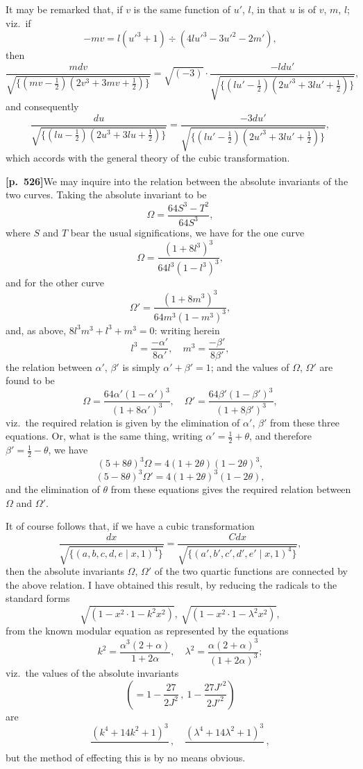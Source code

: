 \documentclass[11pt,a4paper]{article}
\begin{document}
It may be remarked that, if $v$ is the same function of $u'$, $l$, in that $u$ is of $v$, $m$, $l$; viz.\ if
\[
-mv = l(u'^{3} + 1) \div (4lu'^{3} - 3u'^{2} - 2m'),
\]
then
\[
\frac{mdv}{\sqrt{\{(mv - \tfrac{1}{2})(2v^{3} + 3mv + \tfrac{1}{2})\}}} = \sqrt{(-3)} \cdot \frac{-ldu'}{\sqrt{\{(lu' - \tfrac{1}{2})(2u'^{3} + 3lu' + \tfrac{1}{2})\}}},
\]
and consequently
\[
\frac{du}{\sqrt{\{(lu - \tfrac{1}{2})(2u^{3} + 3lu + \tfrac{1}{2})\}}} = \frac{-3du'}{\sqrt{\{(lu' - \tfrac{1}{2})(2u'^{3} + 3lu' + \tfrac{1}{2})\}}},
\]
which accords with the general theory of the cubic transformation.

\noindent\textbf{[p.~526]}\quad We may inquire into the relation between the absolute invariants of the two curves. Taking the absolute invariant to be
\[
\Omega = \frac{64S^{3} - T^{2}}{64S^{3}},
\]
where $S$ and $T$ bear the usual significations, we have for the one curve
\[
\Omega = \frac{(1 + 8l^{3})^{3}}{64l^{3}(1 - l^{3})^{3}},
\]
and for the other curve
\[
\Omega' = \frac{(1 + 8m^{3})^{3}}{64m^{3}(1 - m^{3})^{3}},
\]
and, as above, $8l^{3}m^{3} + l^{3} + m^{3} = 0$: writing herein
\[
l^{3} = \frac{-\alpha'}{8\alpha'},\quad m^{3} = \frac{-\beta'}{8\beta'},
\]
the relation between $\alpha'$, $\beta'$ is simply $\alpha' + \beta' = 1$; and the values of $\Omega$, $\Omega'$ are found to be
\[
\Omega = \frac{64\alpha'(1 - \alpha')^{3}}{(1 + 8\alpha')^{3}},\quad \Omega' = \frac{64\beta'(1 - \beta')^{3}}{(1 + 8\beta')^{3}},
\]
viz.\ the required relation is given by the elimination of $\alpha'$, $\beta'$ from these three equations. Or, what is the same thing, writing $\alpha' = \tfrac{1}{2} + \theta$, and therefore $\beta' = \tfrac{1}{2} - \theta$, we have
\[
(5 + 8\theta)^{3}\Omega = 4(1 + 2\theta)(1 - 2\theta)^{3},
\]
\[
(5 - 8\theta)^{3}\Omega' = 4(1 + 2\theta)^{3}(1 - 2\theta),
\]
and the elimination of $\theta$ from these equations gives the required relation between $\Omega$ and $\Omega'$.

It of course follows that, if we have a cubic transformation
\[
\frac{dx}{\sqrt{\{(a, b, c, d, e \mid x, 1)^{4}\}}} = \frac{Cdx}{\sqrt{\{(a', b', c', d', e' \mid x, 1)^{4}\}}},
\]
then the absolute invariants $\Omega$, $\Omega'$ of the two quartic functions are connected by the above relation. I have obtained this result, by reducing the radicals to the standard forms
\[
\sqrt{(1 - x^{2} \cdot 1 - k^{2}x^{2})},\ \sqrt{(1 - x^{2} \cdot 1 - \lambda^{2}x^{2})},
\]
from the known modular equation as represented by the equations
\[
k^{2} = \frac{\alpha^{3}(2 + \alpha)}{1 + 2\alpha},\quad \lambda^{2} = \frac{\alpha(2 + \alpha)^{3}}{(1 + 2\alpha)^{3}};
\]
viz.\ the values of the absolute invariants
\[
\left(= 1 - \frac{27}{2J^{2}}\,,\ 1 - \frac{27J'^{2}}{2J'^{2}}\right)
\]
are
\[
\frac{(k^{4} + 14k^{2} + 1)^{3}}{}\,,\quad \frac{(\lambda^{4} + 14\lambda^{2} + 1)^{3}}{}\,,
\]
but the method of effecting this is by no means obvious.
\end{document}
